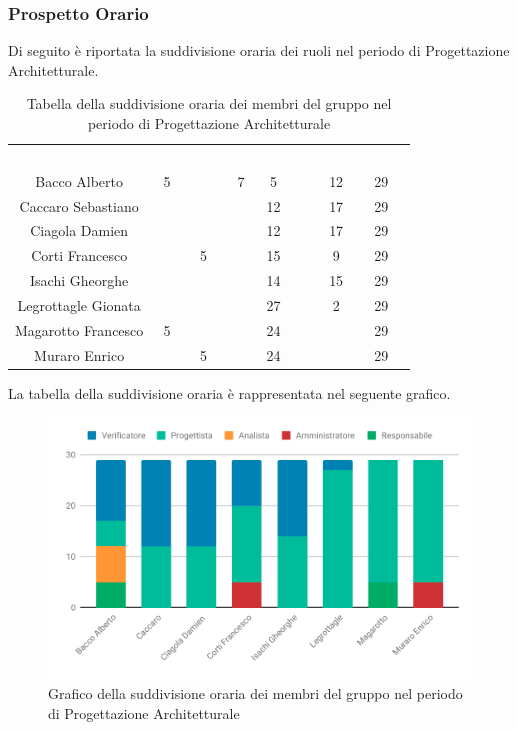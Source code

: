 \subsubsection{Prospetto Orario}
Di seguito è riportata la suddivisione oraria dei ruoli nel periodo di Progettazione Architetturale.




\begin{table}[H]	
	\begin{center}
	    \begin{tabular}{cccccccc}
			\rowcolor{greySWEight}
			\textcolor{white}{\textbf{Nome}} & \textcolor{white}{\textbf{Re}} & \textcolor{white}{\textbf{Am}} & \textcolor{white}{\textbf{An}} & \textcolor{white}{\textbf{Pj}} & \textcolor{white}{\textbf{Pr}} & \textcolor{white}{\textbf{Ve}} & \textcolor{white}{\textbf{Totale}}
			\\
			Bacco Alberto & 5 & & 7 & 5 & & 12 & 29 \\
			Caccaro Sebastiano & & & & 12 & & 17 & 29 \\
			Ciagola Damien & & & & 12 & & 17 & 29 \\
			Corti Francesco & & 5 & & 15 & & 9 & 29 \\
			Isachi Gheorghe & & & & 14 & & 15 & 29 \\
			Legrottagle Gionata & & & & 27 & & 2 & 29 \\
			Magarotto Francesco & 5 & & & 24 & & & 29 \\
			Muraro Enrico & & 5 & & 24 & & & 29 \\
			\end{tabular}
	    \caption{Tabella della suddivisione oraria dei membri del gruppo nel periodo di Progettazione Architetturale} \label{tab:tabellaPersoneProgettazione Architetturale} 
	\end{center}
\end{table}

La tabella della suddivisione oraria è rappresentata nel seguente grafico.
\begin{figure}[H]
	\includegraphics[width=1\linewidth]{Preventivo/grafici/PA1.pdf}
	\caption{Grafico della suddivisione oraria dei membri del gruppo nel periodo di Progettazione Architetturale}
\end{figure}

